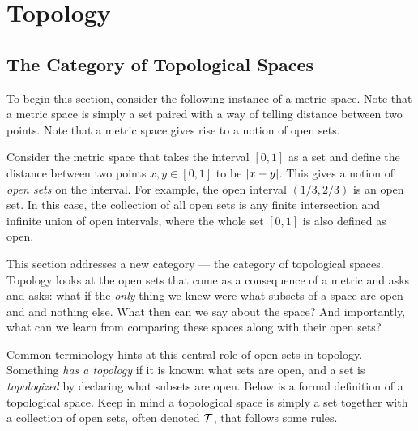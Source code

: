 \documentclass[../sean_thesis.tex]{subfiles}
\begin{document}
\chapter{Topology}

\section{The Category of Topological Spaces}


To begin this section, consider the following instance of a metric space. Note that a metric space is simply a set paired with a way of telling distance between two points. Note that a metric space gives rise to a notion of open sets.

\begin{example}
\label{ex:interval_ms}
Consider the metric space that takes the interval $[0,1]$ as a set and define the distance between two points $x,y \in [0,1]$ to be $\vert x-y \vert$. This gives a notion of \emph{open sets} on the interval. For example, the open interval $(1/3,2/3)$ is an open set. In this case, the collection of all open sets is any finite intersection and infinite union of open intervals, where the whole set $[0,1]$ is also defined as open. 
\end{example}

This section addresses a new category --- the category of topological spaces. Topology looks at the open sets that come as a consequence of a metric and asks and asks: what if the \emph{only} thing we knew were what subsets of a space are open and and nothing else. What then can we say about the space? And importantly, what can we learn from comparing these spaces along with their open sets?

Common terminology hints at this central role of open sets in topology. Something \emph{has a topology} if it is knowm what sets are open, and a set is \emph{topologized} by declaring what subsets are open. Below is a formal definition of a topological space. Keep in mind a topological space is simply a set together with a collection of open sets, often denoted $\mathcal{T}$, that follows some rules.
\end{document}
